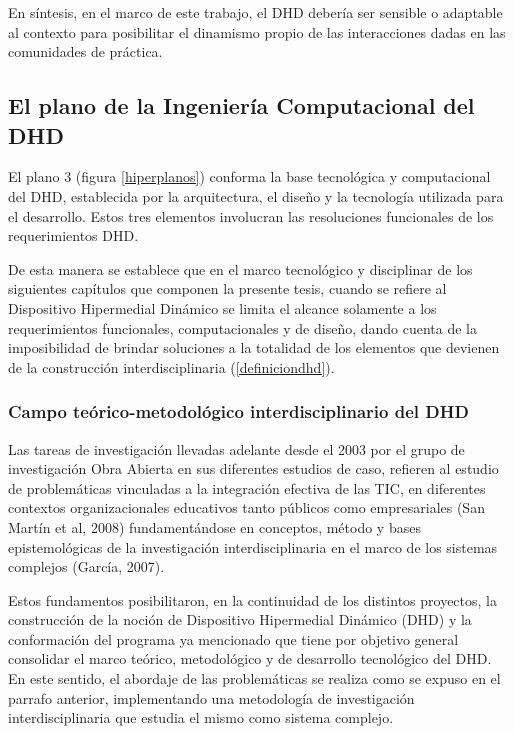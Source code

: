 En síntesis, en el marco de este trabajo, el DHD debería ser sensible o adaptable al contexto para posibilitar el
dinamismo propio de las interacciones dadas en las comunidades de práctica.


\subsection{El plano de la Ingeniería Computacional del DHD} \label{plano3}

El plano 3 (figura \ref{hiperplanos}) conforma la base tecnológica y
computacional del DHD, establecida por la arquitectura, el diseño y la
tecnología utilizada para el desarrollo. Estos tres elementos involucran las
resoluciones funcionales de los requerimientos DHD. 


De esta manera se establece que en el marco tecnológico y disciplinar de los
siguientes capítulos que componen la presente tesis, cuando se refiere
al Dispositivo Hipermedial Dinámico se limita el alcance solamente a los
requerimientos funcionales, computacionales y de diseño, dando cuenta de la
imposibilidad de brindar soluciones a la totalidad de los elementos que devienen
de la construcción interdisciplinaria (\ref{definiciondhd}).


\subsubsection{Campo teórico-metodológico interdisciplinario del DHD}

Las tareas de investigación llevadas adelante desde el 2003 por el grupo de
investigación Obra Abierta en sus diferentes estudios de caso, refieren al
estudio de problemáticas vinculadas a la integración efectiva de las TIC, en
diferentes contextos organizacionales educativos tanto públicos
como empresariales (San Martín et al, 2008) fundamentándose en conceptos, método
y bases epistemológicas de la investigación interdisciplinaria en el marco de
los sistemas complejos (García, 2007).

Estos fundamentos posibilitaron, en la continuidad de los distintos proyectos,
la construcción de la noción de Dispositivo Hipermedial Dinámico (DHD) y la
conformación del programa ya mencionado que tiene por objetivo general
consolidar el marco teórico, metodológico y de desarrollo tecnológico
del DHD. En este sentido, el abordaje de las problemáticas se realiza como se
expuso en el parrafo anterior, implementando una metodología de investigación
interdisciplinaria que estudia el mismo como sistema complejo.

